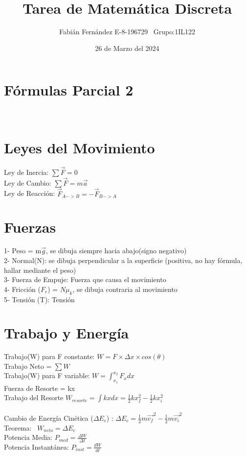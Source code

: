 \documentclass[14pt]{extarticle}
\title{Tarea de Matemática Discreta}
\author{Fabián Fernández E-8-196729   \,\,\,Grupo:1IL122}
\date{26 de Marzo del 2024}
\begin{document}
	\section*{}
	
	\section*{\centering Fórmulas Parcial 2}
	
	\section*{\\ \normalsize Leyes del Movimiento }
	Ley de Inercia: $\sum \vec{F} = 0 $\\
	Ley de Cambio: $\sum \vec{F} = m\vec{a}$ \\
	Ley de Reacción: $\vec{F}_{A->B} = - \vec{F}_{B->A}$
	\section*{ \normalsize Fuerzas }
	1- Peso = m$\vec{g}$, se dibuja siempre hacia abajo(signo negativo) \\
	2- Normal(N): se dibuja perpendicular a la superficie (positiva, no hay fórmula, hallar mediante el peso)\\
	3- Fuerza de Empuje: Fuerza que causa el movimiento\\
	4- Fricción ($F_r$) = $N \mu_k$, se dibuja contraria al movimiento \\
	5- Tensión (T): Tensión
	\section*{\normalsize Trabajo y Energía }
	Trabajo(W) para F constante: $W = F \times \Delta x \times cos(\theta)$\\
	Trabajo Neto = $\sum W$\\
	Trabajo(W) para F variable: $W = \int_{x_1}^{x_2} F_x dx$\\
	Fuerza de Resorte = kx\\
	Trabajo del Resorte $W_{resorte} =\int kx dx = \frac{1}{2} k x_f ^2 -\frac{1}{2} k x_i ^2 $ \\\\
	Cambio de Energía Cinética ($\Delta E_c$) : $\Delta E_c = \frac{1}{2} m \vec{v_f} ^2 -\frac{1}{2} m \vec{v_i} ^2 $ \\
	Teorema: \ $W_{neto} = \Delta E_c $\\ 
	Potencia Media: $P_{med} = \frac{\Delta W}{\Delta t}$\\
	Potencia Instantánea: $P_{inst} = \frac{dW }{dt}$\\
	
\end{document}
